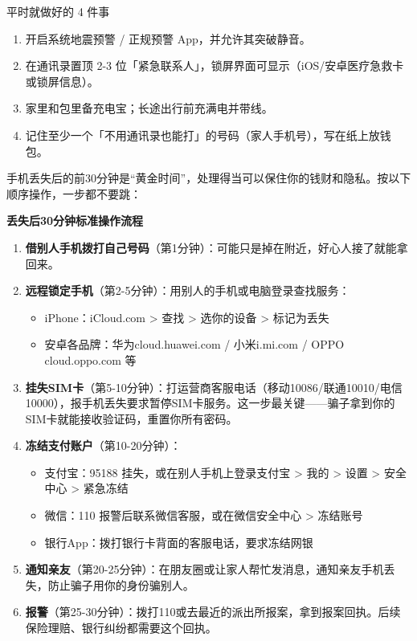 \begin{tcbpractice}{平时就做好的 4 件事}
\begin{enumerate}
  \item 开启系统地震预警 / 正规预警 App，并允许其突破静音。
  \item 在通讯录置顶 2-3 位「紧急联系人」，锁屏界面可显示（iOS/安卓医疗急救卡或锁屏信息）。
  \item 家里和包里备充电宝；长途出行前充满电并带线。
  \item 记住至少一个「不用通讯录也能打」的号码（家人手机号），写在纸上放钱包。
\end{enumerate}

\end{tcbpractice}


手机丢失后的前30分钟是“黄金时间”，处理得当可以保住你的钱财和隐私。按以下顺序操作，一步都不要跳：

\textbf{丢失后30分钟标准操作流程}\par

\begin{enumerate}
  \item \textbf{借别人手机拨打自己号码}（第1分钟）：可能只是掉在附近，好心人接了就能拿回来。
  \item \textbf{远程锁定手机}（第2-5分钟）：用别人的手机或电脑登录查找服务：
  \begin{itemize}
    \item iPhone：iCloud.com > 查找 > 选你的设备 > 标记为丢失
    \item 安卓各品牌：华为cloud.huawei.com / 小米i.mi.com / OPPO cloud.oppo.com 等
  \end{itemize}
  \item \textbf{挂失SIM卡}（第5-10分钟）：打运营商客服电话（移动10086/联通10010/电信10000），报手机丢失要求暂停SIM卡服务。这一步最关键——骗子拿到你的SIM卡就能接收验证码，重置你所有密码。
  \item \textbf{冻结支付账户}（第10-20分钟）：
  \begin{itemize}
    \item 支付宝：95188 挂失，或在别人手机上登录支付宝 > 我的 > 设置 > 安全中心 > 紧急冻结
    \item 微信：110 报警后联系微信客服，或在微信安全中心 > 冻结账号
    \item 银行App：拨打银行卡背面的客服电话，要求冻结网银
  \end{itemize}
  \item \textbf{通知亲友}（第20-25分钟）：在朋友圈或让家人帮忙发消息，通知亲友手机丢失，防止骗子用你的身份骗别人。
  \item \textbf{报警}（第25-30分钟）：拨打110或去最近的派出所报案，拿到报案回执。后续保险理赔、银行纠纷都需要这个回执。
\end{enumerate}

